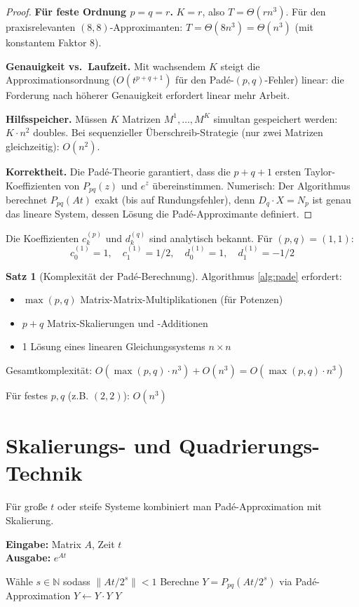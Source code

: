 \documentclass[a4paper,12pt]{report}
\theoremstyle{definition}
\newtheorem{satz}{Satz}
\begin{document}
\begin{proof}
		\textbf{Für feste Ordnung $p = q = r$.} $K = r$, also $T = \Theta(r n^3)$. Für den praxisrelevanten $(8,8)$-Approximanten: $T = \Theta(8 n^3) = \Theta(n^3)$ (mit konstantem Faktor 8).

		\textbf{Genauigkeit vs.\ Laufzeit.} Mit wachsendem $K$ steigt die Approximationsordnung ($O(t^{p+q+1})$ für den Padé-$(p,q)$-Fehler) linear: die Forderung nach höherer Genauigkeit erfordert linear mehr Arbeit.

		\textbf{Hilfsspeicher.} Müssen $K$ Matrizen $M^1, \ldots, M^K$ simultan gespeichert werden: $K \cdot n^2$ doubles. Bei sequenzieller Überschreib-Strategie (nur zwei Matrizen gleichzeitig): $O(n^2)$.

		\textbf{Korrektheit.} Die Padé-Theorie garantiert, dass die $p+q+1$ ersten Taylor-Koeffizienten von $P_{pq}(z)$ und $e^z$ übereinstimmen. Numerisch: Der Algorithmus berechnet $P_{pq}(At)$ exakt (bis auf Rundungsfehler), denn $D_q \cdot X = N_p$ ist genau das lineare System, dessen Lösung die Padé-Approximante definiert.
	\end{proof}

	Die Koeffizienten $c_k^{(p)}$ und $d_k^{(q)}$ sind analytisch bekannt. Für $(p,q) = (1,1)$:
	\[
	c_0^{(1)} = 1, \quad c_1^{(1)} = 1/2, \quad d_0^{(1)} = 1, \quad d_1^{(1)} = -1/2
	\]
	
	\begin{satz}[Komplexität der Padé-Berechnung]
		Algorithmus \ref{alg:pade} erfordert:
		\begin{itemize}
			\item $\max(p,q)$ Matrix-Matrix-Multiplikationen (für Potenzen)
			\item $p + q$ Matrix-Skalierungen und -Additionen
			\item 1 Lösung eines linearen Gleichungssystems $n \times n$
		\end{itemize}
		
		Gesamtkomplexität: $O(\max(p,q) \cdot n^3) + O(n^3) = O(\max(p,q) \cdot n^3)$
		
		Für festes $p, q$ (z.B. $(2,2)$): $O(n^3)$
	\end{satz}
	
	\section{Skalierungs- und Quadrierungs-Technik}
	
	Für große $t$ oder steife Systeme kombiniert man Padé-Approximation mit Skalierung.
	
	\begin{algorithm}[H]
		\caption{Scaling and Squaring für Matrixexponential}
		\label{alg:scaling-squaring}
		\textbf{Eingabe:} Matrix $A$, Zeit $t$ \\
		\textbf{Ausgabe:} $e^{At}$
		\begin{algorithmic}[1]
			\State Wähle $s \in \mathbb{N}$ sodass $\|At/2^s\| < 1$
			\State Berechne $Y = P_{pq}(At/2^s)$ via Padé-Approximation
			\State $Y \gets Y \cdot Y$ 
			\EndFor
			\State \Return $Y$
		\end{algorithmic}
	\end{algorithm}
\end{document}
